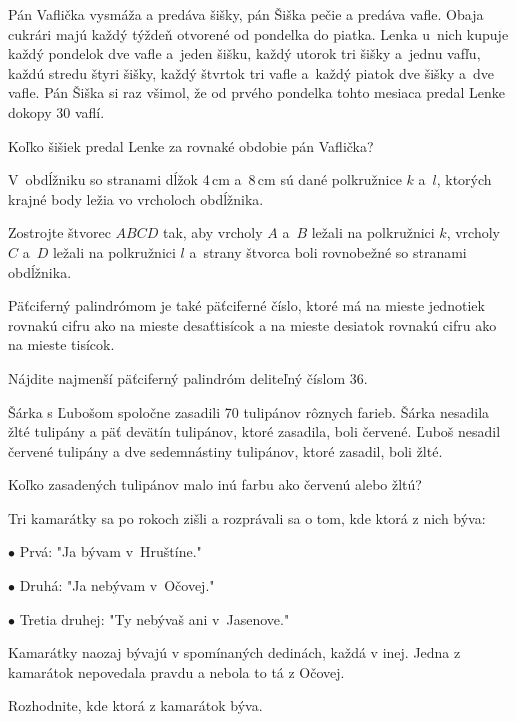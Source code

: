 {%
Pán Vaflička vysmáža a predáva šišky, pán Šiška pečie a predáva vafle.
Obaja cukrári majú každý týždeň otvorené od pondelka do piatka.
Lenka u~nich kupuje každý pondelok dve vafle a~jeden šišku, každý utorok tri šišky a~jednu vafľu, každú stredu štyri šišky, každý štvrtok tri vafle a~každý piatok dve šišky a~dve vafle.
Pán Šiška si raz všimol, že od prvého pondelka tohto mesiaca predal Lenke dokopy 30 vaflí.

Koľko šišiek predal Lenke za rovnaké obdobie pán Vaflička?
}

{%
V~obdĺžniku so stranami dĺžok 4\,cm a~8\,cm sú dané polkružnice $k$ a~$l$, ktorých krajné body ležia vo vrcholoch obdĺžnika.

Zostrojte štvorec $ABCD$ tak, aby vrcholy $A$ a~$B$ ležali na polkružnici $k$, vrcholy $C$ a~$D$ ležali na polkružnici $l$ a~strany štvorca boli rovnobežné so stranami obdĺžnika.
%
}

{%
Päťciferný palindrómom je také päťciferné číslo, ktoré má na mieste jednotiek rovnakú cifru ako na mieste desaťtisícok a na mieste desiatok rovnakú cifru ako na mieste tisícok.

Nájdite najmenší päťciferný palindróm deliteľný číslom 36.
}

{%
Šárka s Ľubošom spoločne zasadili 70 tulipánov rôznych farieb.
Šárka nesadila žlté tulipány a päť devätín tulipánov, ktoré zasadila, boli červené.
Ľuboš nesadil červené tulipány a dve sedemnástiny tulipánov, ktoré zasadil, boli žlté.

Koľko zasadených tulipánov malo inú farbu ako červenú alebo žltú?
}

{%
Tri kamarátky sa po rokoch zišli a rozprávali sa o tom, kde ktorá z nich býva:

\smallskip
\item{$\bullet$} Prvá: "Ja bývam v~Hruštíne."
\item{$\bullet$} Druhá: "Ja nebývam v~Očovej."
\item{$\bullet$} Tretia druhej: "Ty nebývaš ani v~Jasenove."

\smallskip
Kamarátky naozaj bývajú v spomínaných dedinách, každá v inej.
Jedna z kamarátok nepovedala pravdu a nebola to tá z Očovej.

Rozhodnite, kde ktorá z kamarátok býva.
}

